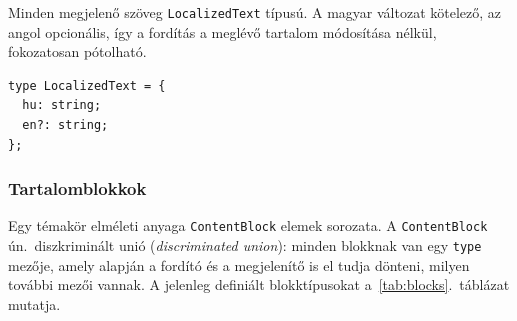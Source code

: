 Minden megjelenő szöveg \texttt{LocalizedText} típusú. A magyar
változat kötelező, az angol opcionális, így a fordítás a meglévő
tartalom módosítása nélkül, fokozatosan pótolható.

\begin{lstlisting}
type LocalizedText = {
  hu: string;
  en?: string;
};
\end{lstlisting}

\subsubsection{Tartalomblokkok}

Egy témakör elméleti anyaga \texttt{ContentBlock} elemek sorozata.
A \texttt{ContentBlock} ún.\ diszkriminált unió (\emph{discriminated
union}): minden blokknak van egy \texttt{type} mezője, amely alapján a
fordító és a megjelenítő is el tudja dönteni, milyen további mezői
vannak. A jelenleg definiált blokktípusokat
a~\ref{tab:blocks}.~táblázat mutatja.

